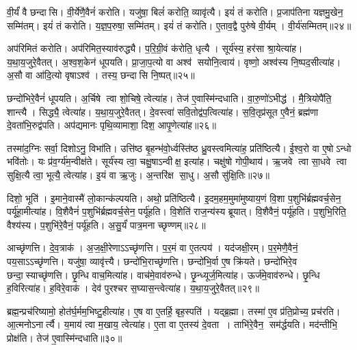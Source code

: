 वी॒र्यं॑ वै छन्दासि। वी॒र्ये॑णै॒वैनं॑ करोति। यजु॑षा॒ बिलं॑ करोति॒ व्यावृ॑त्यै। इयं॑ तं करोति। प्र॒जाप॑तिना यज्ञमु॒खेन॒ सम्मि॑तम्। इयं॑ तं करोति। य॒ज्ञ॒प॒रुषा॒ सम्मि॑तम्। इयं॑ तं करोति। ए॒ताव॒द्वै पुरु॑षे वी॒र्यम्। वी॒र्य॑सम्मितम्॥२४॥

अप॑रिमितं करोति। अप॑रिमित॒स्याव॑रुद्ध्यै। प॒रि॒ग्री॒वं क॑रोति॒ धृत्यै। सूर्य॑स्य॒ हर॑सा श्रा॒येत्या॑ह। य॒था॒य॒जुरे॒वैतत्। अ॒श्व॒श॒केन॑ धूपयति। प्रा॒जा॒प॒त्यो वा अश्व॑ सयोनि॒त्वाय॑। वृष्णो॒ अश्व॑स्य नि॒ष्पद॒सीत्या॑ह। अ॒सौ वा आ॑दि॒त्यो वृषाऽश्व॑। तस्य॒ छन्दासि नि॒ष्पत्॥२५॥

छन्दो॑भिरे॒वैनं॑ धूपयति। अ॒र्चिषे त्वा शो॒चिषे॒ त्वेत्या॑ह। तेज॑ ए॒वास्मि॑न्दधाति। वा॒रु॒णो॑ऽभीद्ध॑। मै॒त्रियोपै॑ति॒ शान्त्यै। सिद्ध्यै॒ त्वेत्या॑ह। य॒था॒य॒जुरे॒वैतत्। दे॒वस्त्वा॑ सवि॒तोद्व॑प॒त्वित्या॑ह। स॒वि॒तृप्र॑सूत ए॒वैनं॒ ब्रह्म॑णा दे॒वता॑भि॒रुद्व॑पति। अप॑द्यमानः पृथि॒व्यामाशा॒ दिश॒ आपृ॒णेत्या॑ह॥२६॥

तस्मा॑द॒ग्निः सर्वा॒ दिशोऽनु॒ विभा॑ति। उत्ति॑ष्ठ बृ॒हन्भ॑वो॒र्ध्वस्ति॑ष्ठ ध्रु॒वस्त्वमित्या॑ह॒ प्रति॑ष्ठित्यै। ई॒श्व॒रो वा ए॒षोऽन्धो भवि॑तोः। यः प्र॑व॒र्ग्य॑म॒न्वीक्ष॑ते। सूर्य॑स्य त्वा॒ चक्षु॒षाऽन्वीक्ष॒ इत्या॑ह। चक्षु॑षो गोपी॒थाय॑। ऋ॒जवे त्वा सा॒धवे त्वा सुक्षि॒त्यै त्वा॒ भूत्यै॒ त्वेत्या॑ह। इ॒यं वा ऋ॒जुः। अ॒न्तरि॑क्ष सा॒धु। अ॒सौ सु॑क्षि॒तिः॥२७॥

दिशो॒ भूति॑। इ॒माने॒वास्मै॑ लो॒कान्क॑ल्पयति। अथो॒ प्रति॑ष्ठित्यै। इ॒दम॒हम॒मुमा॑मुष्याय॒णं  वि॒शा प॒शुभि॑र्ब्रह्मवर्च॒सेन॒ पर्यू॑हा॒मीत्या॑ह। वि॒शैवैनं॑ प॒शुभि॑र्ब्रह्मवर्च॒सेन॒ पर्यू॑हति। वि॒शेति॑ राज॒न्य॑स्य ब्रूयात्। वि॒शैवैनं॒ पर्यू॑हति। प॒शुभि॒रिति॒ वैश्य॑स्य। प॒शुभि॑रे॒वैनं॒ पर्यू॑हति। अ॒सु॒र्यं॑ पात्र॒मनाच्छृण्णम्॥२८॥

आच्छृ॑णत्ति। दे॒व॒त्राक॑। अ॒ज॒क्षी॒रेणाऽऽच्छृ॑णत्ति। प॒र॒मं वा ए॒तत्पय॑। यद॑जक्षी॒रम्। प॒र॒मेणै॒वैनं॒ पय॒साऽऽच्छृ॑णत्ति। यजु॑षा॒ व्यावृ॑त्त्यै। छन्दो॑भि॒राच्छृ॑णत्ति। छन्दो॑भि॒र्वा ए॒ष क्रि॑यते। छन्दो॑भिरे॒व छन्दा॒स्याच्छृ॑णत्ति। छृ॒न्धि वाच॒मित्या॑ह। वाच॑मे॒वाव॑रुन्धे। छृ॒न्ध्यूर्ज॒मित्या॑ह। ऊर्ज॑मे॒वाव॑रुन्धे। छृ॒न्धि ह॒विरित्या॑ह। ह॒विरे॒वाक॑। देव॑ पुरश्चर स॒घ्यास॒न्त्वेत्या॑ह। य॒था॒य॒जुरे॒वैतत्॥२९॥
\anuvakamend[स्या॒द्यत् प्र॑व॒र्ग्य॑श्छन्दो॑भिः करोति वी॒र्य॑सम्मितं॒ छन्दासि नि॒ष्पत्पृ॒णेत्या॑ह सुक्षि॒तिरनाच्छृण्ण॒ञ्छन्दा॒स्या\-च्छृ॑णत्त्य॒ष्टौ च॑]

ब्रह्म॒न्प्रच॑रिष्यामो॒ होत॑र्घ॒र्मम॒भिष्टु॒हीत्या॑ह। ए॒ष वा ए॒तर्\mbox{}हि॒ बृह॒स्पति॑। यद्ब्र॒ह्मा। तस्मा॑ ए॒व प्र॑ति॒प्रोच्य॒ प्रच॑रति। आ॒त्मनोऽनार्त्यै। य॒माय॑ त्वा म॒खाय॒ त्वेत्या॑ह। ए॒ता वा ए॒तस्य॑ दे॒वता। ताभि॑रे॒वैन॒ सम॑र्द्धयति। मद॑न्तीभि॒ प्रोक्ष॑ति। तेज॑ ए॒वास्मि॑न्दधाति॥३०॥

